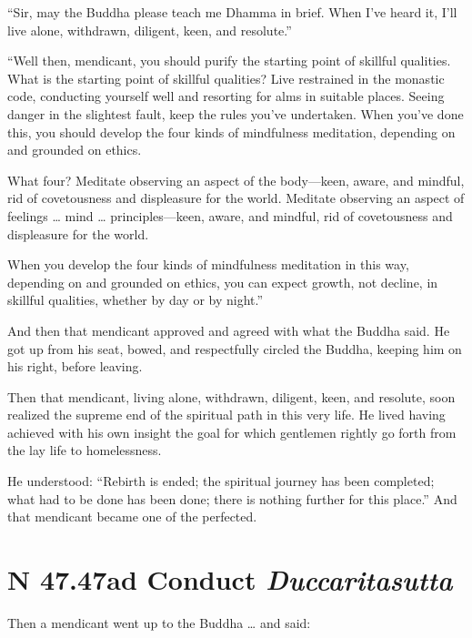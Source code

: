 \documentclass[12pt,openany]{book}%
\newcommand*{\suttatitleacronym}[1]{\smaller[2]{#1}\vspace*{.3em}}
\newcommand*{\suttatitletranslation}[1]{\linebreak{#1}}
\newcommand*{\suttatitleroot}[1]{\linebreak\smaller[2]\itshape{#1}}
\newcommand*{\tocacronym}[1]{\hspace*{-3.3em}{#1}\quad}
\newcommand*{\toctranslation}[1]{#1}
\newcommand*{\tocroot}[1]{(\textit{#1})}
\begin{document}
“Sir, may the Buddha please teach me Dhamma in brief. When I’ve heard it, I’ll live alone, withdrawn, diligent, keen, and resolute.” 

“Well then, mendicant, you should purify the starting point of skillful qualities. What is the starting point of skillful qualities? Live restrained in the monastic code, conducting yourself well and resorting for alms in suitable places. Seeing danger in the slightest fault, keep the rules you’ve undertaken. When you’ve done this, you should develop the four kinds of mindfulness meditation, depending on and grounded on ethics. 

What four? Meditate observing an aspect of the body—keen, aware, and mindful, rid of covetousness and displeasure for the world. Meditate observing an aspect of feelings … mind … principles—keen, aware, and mindful, rid of covetousness and displeasure for the world. 

When you develop the four kinds of mindfulness meditation in this way, depending on and grounded on ethics, you can expect growth, not decline, in skillful qualities, whether by day or by night.” 

And then that mendicant approved and agreed with what the Buddha said. He got up from his seat, bowed, and respectfully circled the Buddha, keeping him on his right, before leaving. 

Then that mendicant, living alone, withdrawn, diligent, keen, and resolute, soon realized the supreme end of the spiritual path in this very life. He lived having achieved with his own insight the goal for which gentlemen rightly go forth from the lay life to homelessness. 

He understood: “Rebirth is ended; the spiritual journey has been completed; what had to be done has been done; there is nothing further for this place.” And that mendicant became one of the perfected. 

%
\section*{{\suttatitleacronym SN 47.47}{\suttatitletranslation Bad Conduct }{\suttatitleroot Duccaritasutta}}
\addcontentsline{toc}{section}{\tocacronym{SN 47.47} \toctranslation{Bad Conduct } \tocroot{Duccaritasutta}}

Then a mendicant went up to the Buddha … and said: 
\end{document}
